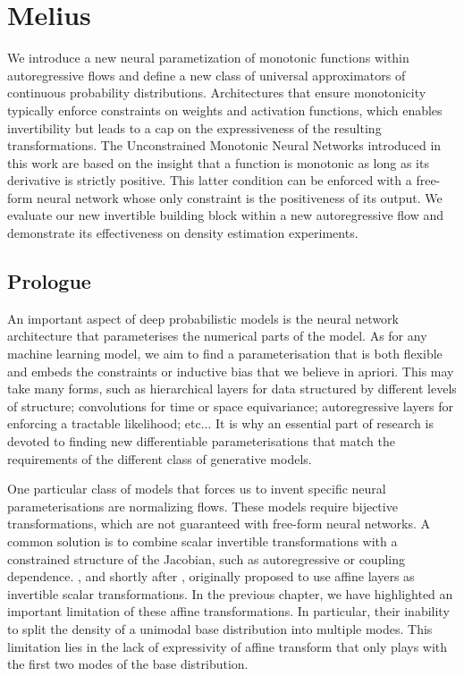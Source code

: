 \chapter{Melius}\label{ch:05}

\begin{chapter_outline}

We introduce a new neural parametization of monotonic functions within autoregressive flows and define a new class of universal approximators of continuous probability distributions.
Architectures that ensure monotonicity typically enforce constraints on weights and activation functions, which enables invertibility but leads to a cap on the expressiveness of the resulting transformations.
The Unconstrained Monotonic Neural Networks introduced in this work are based on the insight that a function is monotonic as long as its derivative is strictly positive. This latter condition can be enforced with a free-form neural network whose only constraint is the positiveness of its output.
We evaluate our new invertible building block within a new autoregressive flow and demonstrate its effectiveness on density estimation experiments.
\end{chapter_outline}

\section{Prologue}
An important aspect of deep probabilistic models is the neural network architecture that parameterises the numerical parts of the model. As for any machine learning model, we aim to find a parameterisation that is both flexible and embeds the constraints or inductive bias that we believe in apriori. This may take many forms, such as hierarchical layers for data structured by different levels of structure; convolutions for time or space equivariance; autoregressive layers for enforcing a tractable likelihood; etc... It is why an essential part of research is devoted to finding new differentiable parameterisations that match the requirements of the different class of generative models.

One particular class of models that forces us to invent specific neural parameterisations are normalizing flows. These models require bijective transformations, which are not guaranteed with free-form neural networks. A common solution is to combine scalar invertible transformations with a constrained structure of the Jacobian, such as autoregressive or coupling dependence. \citet{rezende2015variational}, and shortly after \citet{kingma_improved_2016, dinh_density_2017}, originally proposed to use affine layers as invertible scalar transformations. In the previous chapter, we have highlighted an important limitation of these affine transformations. In particular, their inability to split the density of a unimodal base distribution into multiple modes. This limitation lies in the lack of expressivity of affine transform that only plays with the first two modes of the base distribution.

